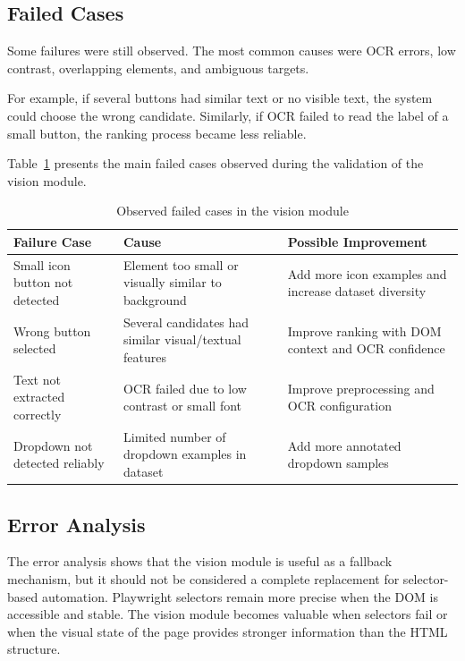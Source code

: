 \subsection{Failed Cases}
\label{subsec:failed_cases}

Some failures were still observed. The most common causes were OCR errors, low contrast, overlapping elements, and ambiguous targets.

For example, if several buttons had similar text or no visible text, the system could choose the wrong candidate. Similarly, if OCR failed to read the label of a small button, the ranking process became less reliable.

Table~\ref{tab:vision_failed_cases} presents the main failed cases observed during the validation of the vision module.

\begin{table}[H]
	\centering
	\caption{Observed failed cases in the vision module}
	\label{tab:vision_failed_cases}
	\renewcommand{\arraystretch}{1.35}
	\small
	\begin{tabularx}{\textwidth}{|X|X|X|}
		\hline
		\rowcolor{gray!20}
		\textbf{Failure Case} & \textbf{Cause} & \textbf{Possible Improvement} \\ \hline
		Small icon button not detected & Element too small or visually similar to background & Add more icon examples and increase dataset diversity \\ \hline
		Wrong button selected & Several candidates had similar visual/textual features & Improve ranking with DOM context and OCR confidence \\ \hline
		Text not extracted correctly & OCR failed due to low contrast or small font & Improve preprocessing and OCR configuration \\ \hline
		Dropdown not detected reliably & Limited number of dropdown examples in dataset & Add more annotated dropdown samples \\ \hline
	\end{tabularx}
\end{table}

\subsection{Error Analysis}
\label{subsec:vision_error_analysis}

The error analysis shows that the vision module is useful as a fallback mechanism, but it should not be considered a complete replacement for selector-based automation. Playwright selectors remain more precise when the DOM is accessible and stable. The vision module becomes valuable when selectors fail or when the visual state of the page provides stronger information than the HTML structure.

